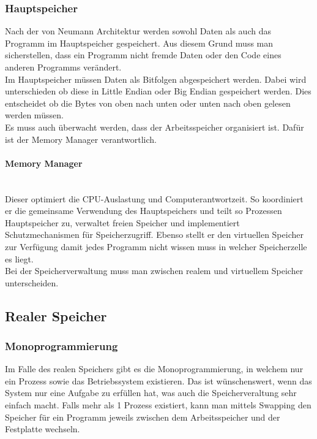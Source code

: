 \documentclass{article}
\newcommand{\paragraphlb}[1]{\paragraph{#1}\mbox{}\\}
\begin{document}
	 \subsubsection{Hauptspeicher}
	Nach der von Neumann Architektur werden sowohl Daten als auch das Programm im Hauptspeicher gespeichert. Aus diesem Grund muss man sicherstellen, dass ein Programm nicht fremde Daten oder den Code eines anderen Programms verändert. \\
	Im Hauptspeicher müssen Daten als Bitfolgen abgespeichert werden. Dabei wird unterschieden ob diese in Little Endian oder Big Endian gespeichert werden.  Dies entscheidet ob die Bytes von oben nach unten oder unten nach oben gelesen werden müssen. \\
	Es muss auch überwacht werden, dass der Arbeitsspeicher organisiert ist. Dafür ist der Memory Manager verantwortlich.
	\paragraphlb{Memory Manager}
	Dieser optimiert die CPU-Auslastung und Computerantwortzeit. So koordiniert er die gemeinsame Verwendung des Hauptspeichers und teilt so Prozessen Hauptspeicher zu, verwaltet freien Speicher und implementiert Schutzmechanismen für Speicherzugriff. Ebenso stellt er den virtuellen Speicher zur Verfügung damit jedes Programm nicht wissen muss in welcher Speicherzelle es liegt.\\
	Bei der Speicherverwaltung muss man zwischen realem und virtuellem Speicher unterscheiden. 
	\subsection{Realer Speicher}
	\subsubsection{Monoprogrammierung}
	Im Falle des realen Speichers gibt es die Monoprogrammierung, in welchem nur ein Prozess sowie das Betriebssystem existieren. Das ist wünschenswert, wenn das System nur eine Aufgabe zu erfüllen hat, was auch die Speicherveraltung sehr einfach macht. Falls mehr als 1 Prozess existiert, kann man mittels Swapping den Speicher für ein Programm jeweils zwischen dem Arbeitsspeicher und der Festplatte wechseln.
\end{document}
